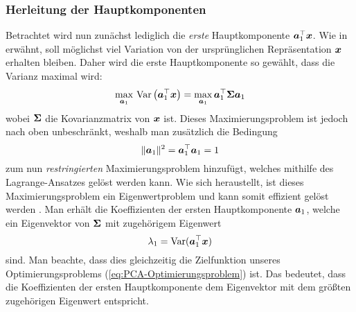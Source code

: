 \subsubsection{Herleitung der Hauptkomponenten}
\label{ch:MethodenDerDimRed:statistisch:PCA:HerleitungPC}
Betrachtet wird nun zunächst lediglich die \textit{erste} Hauptkomponente $\bm{a}_1^\top \bm{x}$. Wie in  erwähnt, soll möglichst viel Variation von der ursprünglichen Repräsentation $\bm{x}$ erhalten bleiben. Daher wird die erste Hauptkomponente so gewählt, dass die Varianz maximal wird:
\begin{equation}
	\label{eq:PCA-Optimierungsproblem}
	\max_{\bm{a}_1}\, \operatorname{Var} \left( \bm{a}_1^\top \bm{x} \right) = \max_{\bm{a}_1} \bm{a}_1^\top \mathbf{\Sigma} \bm{a}_1
\end{equation}
wobei $\mathbf{\Sigma}$ die Kovarianzmatrix von $\bm{x}$ ist. Dieses Maximierungsproblem ist jedoch nach oben unbeschränkt, weshalb man zusätzlich die Bedingung
\begin{equation}
	\lVert \bm{a}_1 \rVert^2 = \bm{a}_1^\top \bm{a}_1 = 1
\end{equation}
zum nun \textit{restringierten} Maximierungsproblem hinzufügt, welches mithilfe des Lagrange-Ansatzes gelöst werden kann. Wie sich heraustellt, ist dieses Maximierungsproblem ein Eigenwertproblem und kann somit effizient gelöst werden \parencite[vgl.][4 -- 6]{Jolliffe.2002}. Man erhält die Koeffizienten der
ersten Hauptkomponente $\bm{a}_1$, welche ein Eigenvektor von $\mathbf{\Sigma}$ mit zugehörigem
Eigenwert
\begin{equation}
	\lambda_1 = \operatorname{Var}(\bm{a}_1^\top \bm{x})
\end{equation}
sind. Man beachte, dass dies gleichzeitig die Zielfunktion unseres Optimierungsproblems (\eqref{eq:PCA-Optimierungsproblem}) ist. Das bedeutet, dass die Koeffizienten der ersten Hauptkomponente dem Eigenvektor mit dem größten zugehörigen Eigenwert entspricht.

